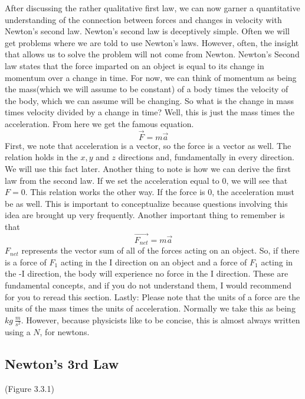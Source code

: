 \documentclass{article}[gray]
\numberwithin{equation}{subsection}
\begin{document}
After discussing the rather qualitative first law, we can now garner a quantitative understanding of the connection between forces and changes in velocity with Newton’s second law. Newton’s second law is deceptively simple. Often we will get problems where we are told to use Newton’s laws. However, often, the insight that allows us to solve the problem will not come from Newton. Newton’s Second law states that the force imparted on an object is equal to its change in momentum over a change in time. For now, we can think of momentum as being the mass(which we will assume to be constant) of a body times the velocity of the body, which we can assume will be changing. So what is the change in mass times velocity divided by a change in time? Well, this is just the mass times the acceleration. From here we get the famous equation. \begin{equation}\vec{F}=m\vec{a}\end{equation} First, we note that acceleration is a vector, so the force is a vector as well. The relation holds in the $x,y$ and $z$ directions and, fundamentally in every direction. We will use this fact later. Another thing to note is how we can derive the first law from the second law. If we set the acceleration equal to 0, we will see that $F=0$. This relation works the other way. If the force is 0, the acceleration must be as well. This is important to conceptualize because questions involving this idea are brought up very frequently. Another important thing to remember is that \begin{equation}\vec{F_{net}}=m\vec{a}\end{equation} $F_{net}$ represents the vector sum of all of the forces acting on an object. So, if there is a force of $F_1$ acting in the I direction on an object and a force of $F_1$ acting in the -I direction, the body will experience no force in the I direction. These are fundamental concepts, and if you do not understand them, I would recommend for you to reread this section. Lastly: Please note that the units of a force are the units of the mass times the units of acceleration. Normally we take this as being $kg \ \frac{m}{s^2}$. However, because physicists like to be concise, this is almost always written using a $N$, for newtons. 

\subsection{Newton's 3rd Law}
\begin{center}
(Figure 3.3.1)
\end{center}
\end{document}
